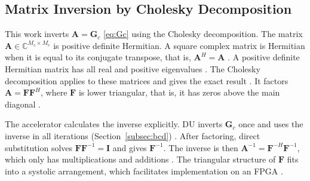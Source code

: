 \subsection{Matrix Inversion by Cholesky Decomposition}\label{subsec:inversao}\label{sec:inversao}
This work inverts $\mathbf A = \mathbf G_c$ \eqref{eq:Gc} using the Cholesky decomposition. The matrix $\mathbf A \in \mathbb{C}^{M_c \times M_c}$ is positive definite Hermitian. A square complex matrix is ​​Hermitian when it is equal to its conjugate transpose, that is, $\mathbf A^H = \mathbf A$ \cite{tse-viswanath}. A positive definite Hermitian matrix has all real and positive eigenvalues ​​\cite{wang2021tlbdinsa}. The Cholesky decomposition applies to these matrices \cite{wang2023bdnsepa} and gives the exact result \cite{li-tradeofs}. It factors $\mathbf A = \mathbf F\mathbf F^H$, where $\mathbf F$ is lower triangular, that is, it has zeros above the main diagonal \cite{li-tradeofs}.

The accelerator calculates the inverse explicitly. DU inverts $\mathbf G_c$ once and uses the inverse in all iterations (Section~\ref{subsec:bcd}) \cite{li-tradeofs}. After factoring, direct substitution solves $\mathbf F\mathbf F^{-1} = \mathbf I$ and gives $\mathbf F^{-1}$. The inverse is then $\mathbf A^{-1} = \mathbf F^{-H}\mathbf F^{-1}$, which only has multiplications and additions \cite{wang2021tlbdinsa}. The triangular structure of $\mathbf F$ fits into a systolic arrangement, which facilitates implementation on an FPGA \cite{wang2023bdnsepa}.
